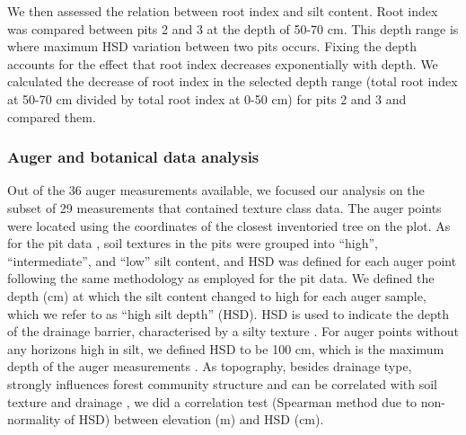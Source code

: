 \documentclass[fleqn,12pt]{latex/stylish_article} %
\begin{document}
We then assessed the relation between root index and silt content. Root index was compared between pits 2 and 3 at the depth of 50-70 cm. This depth range is where maximum HSD variation between two pits occurs. Fixing the depth accounts for the effect that root index decreases exponentially with depth. We calculated the decrease of root index in the selected depth range (total root index at 50-70 cm divided by total root index at 0-50 cm) for pits 2 and 3 and compared them.

\hypertarget{auger-and-botanical-data-analysis}{%
\subsubsection{Auger and botanical data analysis}\label{auger-and-botanical-data-analysis}}

Out of the 36 auger measurements available, we focused our analysis on the subset of 29 measurements that contained texture class data. The auger points were located using the coordinates of the closest inventoried tree on the plot. As for the pit data , soil textures in the pits were grouped into \enquote{high}, \enquote{intermediate}, and \enquote{low} silt content, and HSD was defined for each auger point following the same methodology as employed for the pit data. We defined the depth (cm) at which the silt content changed to high for each auger sample, which we refer to as \enquote{high silt depth} (HSD). HSD is used to indicate the depth of the drainage barrier, characterised by a silty texture \citep{ferryGeneseFonctionnementHydrique2003, humbelCaracterisationParMesures1978}. For auger points without any horizons high in silt, we defined HSD to be 100 cm, which is the maximum depth of the auger measurements . As topography, besides drainage type, strongly influences forest community structure \citep{baldeckSoilResourcesTopography2013, ferryHigherTreefallRates2010} and can be correlated with soil texture and drainage \citep{epronSpatialVariationSoil2006}, we did a correlation test (Spearman method due to non-normality of HSD) between elevation (m) and HSD (cm).
\end{document}
